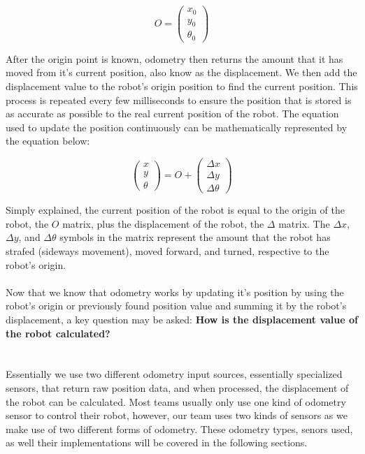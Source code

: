 \documentclass[a4paper,12pt]{article}
\begin{document}
\begin{equation*}
O =
\begin{pmatrix}
x_{0}\\
y_{0}\\
\theta_{0}
\end{pmatrix}
\end{equation*}

After the origin point is known, odometry then returns the amount that it has moved from it's current position, also know as the displacement. We then add the displacement value to the robot's origin position to find the current position. This process is repeated every few milliseconds to ensure the position that is stored is as accurate as possible to the real current position of the robot. The equation used to update the position continuously can be mathematically represented by the equation below:

\begin{equation*}
    \begin{pmatrix}
    x\\
    y\\
    \theta
    \end{pmatrix}
=
O
+
\begin{pmatrix}
\Delta{x}\\
\Delta{y}\\
\Delta{\theta}
\end{pmatrix}
\end{equation*}

Simply explained, the current position of the robot is equal to the origin of the robot, the $O$ matrix, plus the displacement of the robot, the $\Delta$ matrix. The $\Delta{x}$, $\Delta{y}$, and $\Delta{\theta}$ symbols in the matrix represent the amount that the robot has strafed (sideways movement), moved forward, and turned, respective to the robot's origin.
\\
\\
Now that we know that odometry works by updating it's position by using the robot's origin or previously found position value and summing it by the robot's displacement, a key question may be asked: \textbf{How is the displacement value of the robot calculated?}
\\
\\
\\
Essentially we use two different odometry input sources, essentially specialized sensors, that return raw position data, and when processed, the displacement of the robot can be calculated. Most teams usually only use one kind of odometry sensor to control their robot, however, our team uses two kinds of sensors as we make use of two different forms of odometry. These odometry types, senors used, as well their implementations will be covered in the following sections.
\\
\end{document}
